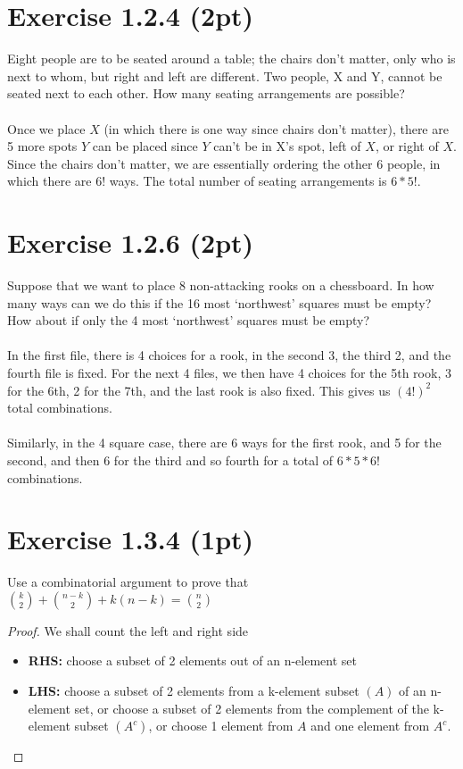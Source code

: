 \documentclass{article}
\begin{document}
\section*{Exercise 1.2.4 (2pt)}
Eight people are to be seated around a table; the chairs don't matter, only who is next to whom, but right and left are different. Two people, X and Y, cannot be seated next to each other. How many seating arrangements are possible?
\paragraph*{}
Once we place $X$ (in which there is one way since chairs don't matter), there are 5 more spots $Y$ can be placed since $Y$ can't be in X's spot, left of $X$, or right of $X$. Since the chairs don't matter, we are essentially ordering the other 6 people, in which there are $6!$ ways. The total number of seating arrangements is $6*5!$.

\section*{Exercise 1.2.6 (2pt)}
Suppose that we want to place 8 non-attacking rooks on a chessboard. In how many ways can we do this if the 16 most `northwest' squares must be empty? How about if only the 4 most `northwest' squares must be empty?
\paragraph*{}
In the first file, there is 4 choices for a rook, in the second 3, the third 2, and the fourth file is fixed. For the next 4 files, we then have 4 choices for the 5th rook, 3 for the 6th, 2 for the 7th, and the last rook is also fixed. This gives us $(4!)^2$ total combinations.
\paragraph*{}
Similarly, in the 4 square case, there are 6 ways for the first rook, and 5 for the second, and then 6 for the third and so fourth for a total of $6*5*6!$ combinations. 

\section*{Exercise 1.3.4 (1pt)}
Use a combinatorial argument to prove that $\binom{k}{2} + \binom{n-k}{2} + k(n-k) = \binom{n}{2}$
\begin{proof} We shall count the left and right side
	\begin{itemize}
		\item[]\textbf{RHS:} choose a subset of 2 elements out of an n-element set 
		\item[]\textbf{LHS:} choose a subset of 2 elements from a k-element subset $(A)$ of an n-element set, or choose a subset of 2 elements from the complement of the k-element subset $(A^c)$, or choose 1 element from $A$ and one element from $A^c$.
	\end{itemize}
\end{proof}
\end{document}
